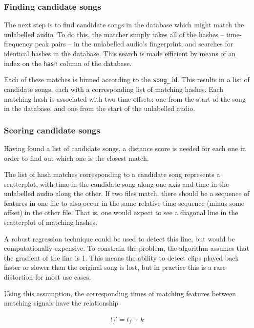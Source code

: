 \documentclass[12pt,a4paper,twoside,openright]{report}
\begin{document}
\subsubsection{Finding candidate songs}

The next step is to find candidate songs in the database which might match the unlabelled audio. To do this, the matcher simply takes all of the hashes -- time-frequency peak pairs -- in the unlabelled audio's fingerprint, and searches for identical hashes in the database. This search is made efficient by means of an index on the \lstinline{hash} column of the database.

Each of these matches is binned according to the \lstinline{song_id}. This results in a list of candidate songs, each with a corresponding list of matching hashes. Each matching hash is associated with two time offsets: one  from the start of the song in the database, and one from the start of the unlabelled audio.

\subsubsection{Scoring candidate songs}

Having found a list of candidate songs, a distance score is needed for each one in order to find out which one is the closest match.

The list of hash matches corresponding to a candidate song represents a scatterplot, with time in the candidate song along one axis and time in the unlabelled audio along the other. If two files match, there should be a sequence of features in one file to also occur in the same relative time sequence (minus some offset) in the other file. That is, one would expect to see a diagonal line in the scatterplot of matching hashes.

A robust regression technique could be used to detect this line, but would be computationally expensive. To constrain the problem, the algorithm assumes that the gradient of the line is 1. This means the ability to detect clips played back faster or slower than the original song is lost, but in practice this is a rare distortion for most use cases.

Using this assumption, the corresponding times of matching features between matching signals have the relationship

\begin{align*}
  t_f' = t_f + k 
\end{align*}
\end{document}
